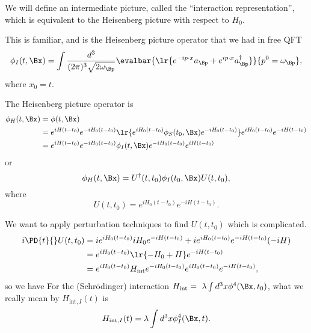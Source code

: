 We will define an intermediate picture, called the ``interaction representation'', which is equivalent to the Heisenberg picture with respect to \( H_0 \).

This is familiar, and is the Heisenberg picture operator that we had in free QFT
\begin{equation}\label{eqn:qftLecture13:700}
\phi_I(t, \Bx) =
\int \frac{d^3}{(2 \pi)^3 \sqrt{ 2 \omega_\Bp } }
\evalbar{
   \lr{
   e^{-i p \cdot x} a_\Bp
   + e^{i p \cdot x} a_\Bp^\dagger }
   }
{
p^0 = \omega_\Bp
},
\end{equation}
where \( x_0 = t \).

The Heisenberg picture operator is
\begin{equation}\label{eqn:qftLecture13:720}
\begin{aligned}
\phi_H(t, \Bx)
&=
\phi(t, \Bx)
\\&=
e^{i H(t - t_0) }
e^{-i H_0(t - t_0) }
\lr{
   e^{i H_0(t - t_0) }
   \phi_S(t_0, \Bx)
   e^{-i H_0(t - t_0) }
}
e^{i H_0(t - t_0) }
e^{-i H(t - t_0) }
\\&=
e^{i H(t - t_0) }
e^{-i H_0(t - t_0) }
\phi_I(t, \Bx)
e^{-i H_0(t - t_0) }
e^{i H(t - t_0) }
\end{aligned}
\end{equation}
or
\begin{equation}\label{eqn:qftLecture13:760}
\phi_H(t, \Bx) = U^\dagger(t, t_0) \phi_I(t_0, \Bx) U(t, t_0),
\end{equation}
where
\begin{equation}\label{eqn:qftLecture13:740}
U(t, t_0) = e^{i H_0(t - t_0) } e^{-i H(t - t_0) }.
\end{equation}

We want to apply perturbation techniques to find \( U(t, t_0) \) which is complicated.
\begin{equation}\label{eqn:qftLecture13:780}
\begin{aligned}
i \PD{t}{} U(t, t_0)
&=
i e^{i H_0(t - t_0) } i H_0
e^{-i H(t - t_0) }
+
i e^{i H_0(t - t_0) }
e^{-i H(t - t_0) } (-i H)
\\&=
e^{i H_0(t - t_0) }
\lr{ -H_0 + H }
e^{-i H(t - t_0) }
\\&=
e^{i H_0(t - t_0) }
H_{\text{int}}
e^{-i H_0(t - t_0) }
e^{i H_0(t - t_0) }
e^{-i H(t - t_0) },
\end{aligned}
\end{equation}
so we have
For the (Schr\"{o}dinger) interaction \( H_{\text{int}} = \
\lambda \int d^3 x \phi^4(\Bx, t_0)  \), what we really mean by
\( H_{\text{int}, I}(t) \) is
\begin{equation}\label{eqn:qftLecture13:820}
H_{\text{int}, I}(t) = \lambda \int d^3 x \phi_I^4(\Bx, t).
\end{equation}


